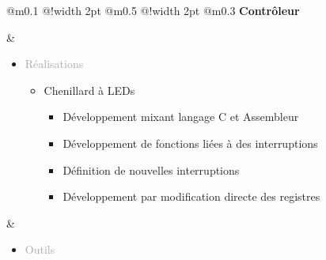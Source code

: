 \documentclass{article}
\begin{document}
\begin{tabular}
    {
        @{}m{}
        @{\hspace{0.001\textwidth}}!{\color{secondaryBlue}\vline width 2pt} %
        @{}m{0.5\textwidth}
        @{\hspace{0.025\textwidth}}!{\color{secondaryBlue}\vline width 2pt} %
        @{{\hspace{0.001\textwidth}}}m{0.3\textwidth}
    }
    \textcolor{secondaryBlue}
    {
        \textbf{\textmu Contrôleur}
    } 

    &
    \begin{itemize}
        [label={}, topsep=8pt, partopsep=0pt, itemsep=0.5pt, parsep=2pt,after=\vspace*{-\baselineskip}]
        \setlength{\itemsep}{10pt}
        \item \textcolor{darkGray}{Réalisations}
        \begin{itemize}
        [label={\textcolor{gray!80}{\checkmark}}, topsep=8pt, partopsep=0pt, itemsep=0.5pt, parsep=2pt, after=\vspace*{-\baselineskip}] 

            \item \textcolor{gray!80}{Chenillard à LEDs}
            \begin{itemize}
                [label={\textcolor{gray!80}{$\triangleright$}}, topsep=0pt, partopsep=0pt, itemsep=0.5pt, parsep=2pt]
                \item \textcolor{gray!80}{Développement mixant langage C et Assembleur}
                \item \textcolor{gray!80}{Développement de fonctions liées à des interruptions}
                \item \textcolor{gray!80}{Définition de nouvelles interruptions}
                \item \textcolor{gray!80}{Développement par modification directe des registres}

            \end{itemize}
        \end{itemize}
    \end{itemize}
    &
    \begin{itemize}
        [label={}, topsep=8pt, partopsep=0pt, itemsep=0.5pt, parsep=2pt,after=\vspace*{-\baselineskip}]
        \setlength{\itemsep}{10pt}
        \item \textcolor{darkGray}{Outils}
        \begin{itemize}
        [label={\textcolor{gray!80}{\checkmark}}, topsep=8pt, partopsep=0pt, itemsep=0.5pt, parsep=2pt,after=\vspace*{-\baselineskip}] 
            

\end{itemize}
\end{itemize}
\end{tabular}
\end{document}
